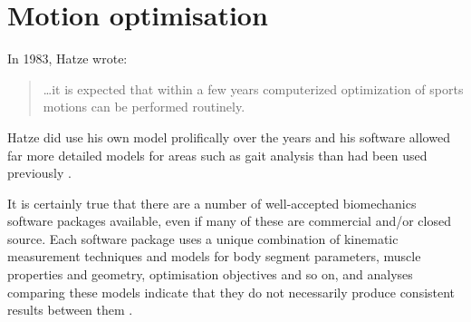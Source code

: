 \documentclass[a4paper]{article}
\begin{document}
\section{Motion optimisation}

In 1983, Hatze wrote:
\begin{quote}
\dots it is expected that within a few years computerized optimization of sports motions can be performed routinely.
\parencite{hatze1983-jss}
\end{quote}
Hatze did use his own model prolifically over the years and his software allowed far more detailed models for areas such as gait analysis than had been used previously \parencite{hatze1987-jmb}.

It is certainly true that there are a number of well-accepted biomechanics software packages available, even if many of these are commercial and/or closed source.
Each software package uses a unique combination of kinematic measurement techniques and models for body segment parameters, muscle properties and geometry, optimisation objectives and so on, and analyses comparing these models indicate that they do not necessarily produce consistent results between them \parencite{wagner2013-abe}.


\printbibliography
\end{document}
